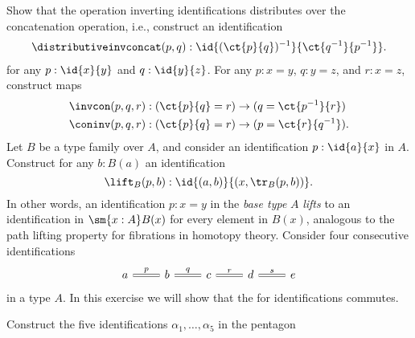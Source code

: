 \begin{exercises}
  \exitem \label{ex:inv_assoc}Show that the operation inverting identifications distributes over the concatenation operation, i.e., construct an identification
  \begin{align*}
    \distributiveinvconcat(p,q):\id{(\ct{p}{q})^{-1}}{\ct{q^{-1}}{p^{-1}}}.
  \end{align*}
  for any $p:\id{x}{y}$ and $q:\id{y}{z}$.
  \exitem \label{ex:inv_con}For any $p:x=y$, $q:y=z$, and $r:x=z$, construct maps
  \begin{align*}
    \invcon(p,q,r) & : (\ct{p}{q}=r)\to (q=\ct{p^{-1}}{r}) \\
    \coninv(p,q,r) & : (\ct{p}{q}=r)\to (p=\ct{r}{q^{-1}}).
  \end{align*}
  \exitem Let $B$ be a type family over $A$, and consider an identification $p:\id{a}{x}$ in $A$. Construct for any $b:B(a)$ an identification
  \begin{equation*}
    \lift_B(p,b) : \id{(a,b)}{(x,\tr_B(p,b))}.
  \end{equation*}
  In other words, an identification $p:x=y$ in the \emph{base type} $A$ \emph{lifts} to an identification in $\sm{x:A}B(x)$ for every element in $B(x)$, analogous to the path lifting property for fibrations in homotopy theory.
  \exitem Consider four consecutive identifications
  \begin{equation*}
    \begin{tikzcd}
      a \arrow[r,equals,"p"] & b \arrow[r,equals,"q"] & c \arrow[r,equals,"r"] & d \arrow[r,equals,"s"] & e
    \end{tikzcd}
  \end{equation*}
  in a type $A$. In this exercise we will show that the  for identifications commutes.
  \begin{subexenum}
  \item Construct the five identifications $\alpha_1,\ldots,\alpha_5$ in the pentagon
    \begin{equation*}
      \begin{tikzcd}[column sep=-1.5em]

\end{tikzcd}
\end{equation*}
\end{subexenum}
\end{exercises}
